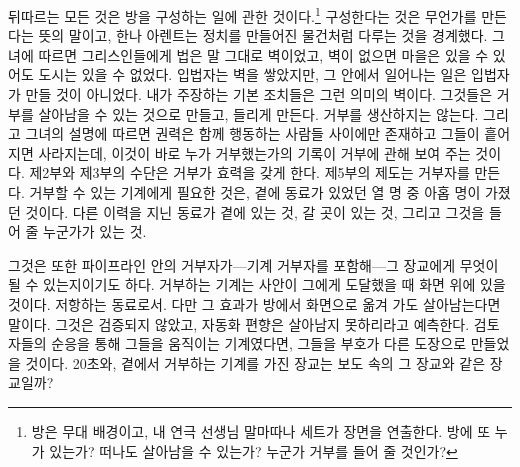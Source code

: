 뒤따르는 모든 것은 방을 구성하는 일에 관한 것이다.\footnote{방은 무대 배경이고, 내 연극 선생님 말마따나 세트가 장면을 연출한다. 방에 또 누가 있는가? 떠나도 살아남을 수 있는가? 누군가 거부를 들어 줄 것인가?} 구성한다는 것은 무언가를 만든다는 뜻의 말이고, 한나 아렌트는 정치를 만들어진 물건처럼 다루는 것을 경계했다. 그녀에 따르면 그리스인들에게 법은 말 그대로 벽이었고, 벽이 없으면 마을은 있을 수 있어도 도시는 있을 수 없었다\autocite{arendt1958human}. 입법자는 벽을 쌓았지만, 그 안에서 일어나는 일은 입법자가 만들 것이 아니었다. 내가 주장하는 기본 조치들은 그런 의미의 벽이다. 그것들은 거부를 살아남을 수 있는 것으로 만들고, 들리게 만든다. 거부를 생산하지는 않는다. 그리고 그녀의 설명에 따르면 권력은 함께 행동하는 사람들 사이에만 존재하고 그들이 흩어지면 사라지는데, 이것이 바로 누가 거부했는가의 기록이 거부에 관해 보여 주는 것이다. 제2부와 제3부의 수단은 거부가 효력을 갖게 한다. 제5부의 제도는 거부자를 만든다. 거부할 수 있는 기계에게 필요한 것은, 곁에 동료가 있었던 열 명 중 아홉 명이 가졌던 것이다. 다른 이력을 지닌 동료가 곁에 있는 것, 갈 곳이 있는 것, 그리고 그것을 들어 줄 누군가가 있는 것.

그것은 또한 파이프라인 안의 거부자가—기계 거부자를 포함해—그 장교에게 무엇이 될 수 있는지이기도 하다. 거부하는 기계는 사안이 그에게 도달했을 때 화면 위에 있을 것이다. 저항하는 동료로서. 다만 그 효과가 방에서 화면으로 옮겨 가도 살아남는다면 말이다. 그것은 검증되지 않았고, 자동화 편향은 살아남지 못하리라고 예측한다. 검토자들의 순응을 통해 그들을 움직이는 기계였다면, 그들을 부호가 다른 도장으로 만들었을 것이다. 20초와, 곁에서 거부하는 기계를 가진 장교는 보도 속의 그 장교와 같은 장교일까?
